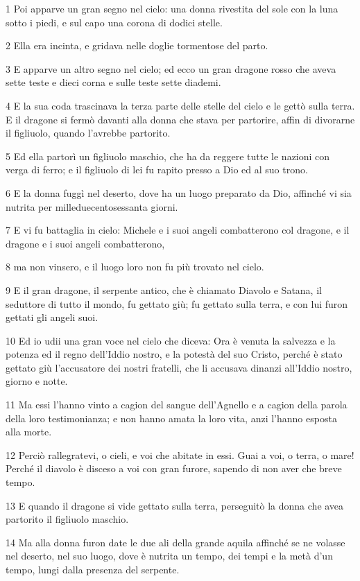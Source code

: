 \par 1 Poi apparve un gran segno nel cielo: una donna rivestita del sole con la luna sotto i piedi, e sul capo una corona di dodici stelle.
\par 2 Ella era incinta, e gridava nelle doglie tormentose del parto.
\par 3 E apparve un altro segno nel cielo; ed ecco un gran dragone rosso che aveva sette teste e dieci corna e sulle teste sette diademi.
\par 4 E la sua coda trascinava la terza parte delle stelle del cielo e le gettò sulla terra. E il dragone si fermò davanti alla donna che stava per partorire, affin di divorarne il figliuolo, quando l'avrebbe partorito.
\par 5 Ed ella partorì un figliuolo maschio, che ha da reggere tutte le nazioni con verga di ferro; e il figliuolo di lei fu rapito presso a Dio ed al suo trono.
\par 6 E la donna fuggì nel deserto, dove ha un luogo preparato da Dio, affinché vi sia nutrita per milleduecentosessanta giorni.
\par 7 E vi fu battaglia in cielo: Michele e i suoi angeli combatterono col dragone, e il dragone e i suoi angeli combatterono,
\par 8 ma non vinsero, e il luogo loro non fu più trovato nel cielo.
\par 9 E il gran dragone, il serpente antico, che è chiamato Diavolo e Satana, il seduttore di tutto il mondo, fu gettato giù; fu gettato sulla terra, e con lui furon gettati gli angeli suoi.
\par 10 Ed io udii una gran voce nel cielo che diceva: Ora è venuta la salvezza e la potenza ed il regno dell'Iddio nostro, e la potestà del suo Cristo, perché è stato gettato giù l'accusatore dei nostri fratelli, che li accusava dinanzi all'Iddio nostro, giorno e notte.
\par 11 Ma essi l'hanno vinto a cagion del sangue dell'Agnello e a cagion della parola della loro testimonianza; e non hanno amata la loro vita, anzi l'hanno esposta alla morte.
\par 12 Perciò rallegratevi, o cieli, e voi che abitate in essi. Guai a voi, o terra, o mare! Perché il diavolo è disceso a voi con gran furore, sapendo di non aver che breve tempo.
\par 13 E quando il dragone si vide gettato sulla terra, perseguitò la donna che avea partorito il figliuolo maschio.
\par 14 Ma alla donna furon date le due ali della grande aquila affinché se ne volasse nel deserto, nel suo luogo, dove è nutrita un tempo, dei tempi e la metà d'un tempo, lungi dalla presenza del serpente.

